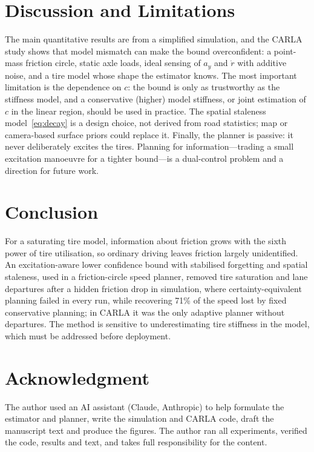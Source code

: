 \documentclass[letterpaper,journal,twoside]{IEEEtran}%
\begin{document}
\section{Discussion and Limitations}
The main quantitative results are from a simplified simulation, and the CARLA study shows that model mismatch can make the bound overconfident: a point-mass friction circle, static axle loads, ideal sensing of $a_y$ and $\dot r$ with additive noise, and a tire model whose shape the estimator knows. The most important limitation is the dependence on $c$: the bound is only as trustworthy as the stiffness model, and a conservative (higher) model stiffness, or joint estimation of $c$ in the linear region, should be used in practice. The spatial staleness model~\eqref{eq:decay} is a design choice, not derived from road statistics; map or camera-based surface priors could replace it. Finally, the planner is passive: it never deliberately excites the tires. Planning for information---trading a small excitation manoeuvre for a tighter bound---is a dual-control problem and a direction for future work.

\section{Conclusion}
For a saturating tire model, information about friction grows with the sixth power of tire utilisation, so ordinary driving leaves friction largely unidentified. An excitation-aware lower confidence bound with stabilised forgetting and spatial staleness, used in a friction-circle speed planner, removed tire saturation and lane departures after a hidden friction drop in simulation, where certainty-equivalent planning failed in every run, while recovering 71\% of the speed lost by fixed conservative planning; in CARLA it was the only adaptive planner without departures. The method is sensitive to underestimating tire stiffness in the model, which must be addressed before deployment.

\section*{Acknowledgment}
The author used an AI assistant (Claude, Anthropic) to help formulate the estimator and planner, write the simulation and CARLA code, draft the manuscript text and produce the figures. The author ran all experiments, verified the code, results and text, and takes full responsibility for the content.
\end{document}
